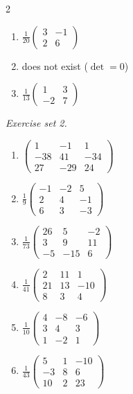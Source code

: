 \begin{multicols}{2}
\begin{enumerate}[label=\arabic*., leftmargin=*, itemsep=1pt]
\item $\frac{1}{20}\left(\begin{smallmatrix}3 & -1\\ 2 & 6\end{smallmatrix}\right)$
\item does not exist ($\det=0$)
\item $\frac{1}{13}\left(\begin{smallmatrix}1 & 3\\ -2 & 7\end{smallmatrix}\right)$
\end{enumerate}
\end{multicols}
\par\noindent\emph{Exercise set 2.}\nopagebreak
\begin{enumerate}[label=\arabic*., leftmargin=*, itemsep=1pt]
\item $\left(\begin{smallmatrix}1 & -1 & 1\\ -38 & 41 & -34\\ 27 & -29 & 24\end{smallmatrix}\right)$
\item $\frac{1}{9}\left(\begin{smallmatrix}-1 & -2 & 5\\ 2 & 4 & -1\\ 6 & 3 & -3\end{smallmatrix}\right)$
\item $\frac{1}{73}\left(\begin{smallmatrix}26 & 5 & -2\\ 3 & 9 & 11\\ -5 & -15 & 6\end{smallmatrix}\right)$
\item $\frac{1}{41}\left(\begin{smallmatrix}2 & 11 & 1\\ 21 & 13 & -10\\ 8 & 3 & 4\end{smallmatrix}\right)$
\item $\frac{1}{10}\left(\begin{smallmatrix}4 & -8 & -6\\ 3 & 4 & 3\\ 1 & -2 & 1\end{smallmatrix}\right)$
\item $\frac{1}{43}\left(\begin{smallmatrix}5 & 1 & -10\\ -3 & 8 & 6\\ 10 & 2 & 23\end{smallmatrix}\right)$

\end{enumerate}
